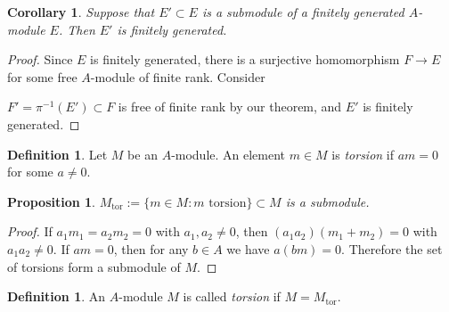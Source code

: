 \documentclass[12pt]{report}
\theoremstyle{plain}
\newtheorem{corollary}[theorem]{Corollary}
\newtheorem{proposition}[theorem]{Proposition}
\theoremstyle{remark}
\theoremstyle{definition}
\newtheorem{definition}[theorem]{Definition}
\begin{document}
\begin{corollary}
    Suppose that $E'\subset E$ is a submodule of a finitely generated $A$-module $E$. Then $E'$ is finitely generated.
\end{corollary}
\begin{proof}
    Since $E$ is finitely generated, there is a surjective homomorphism $F\to E$ for some free $A$-module of finite rank. Consider
    \begin{figure}[H]
        \centering
    \end{figure}
    \noindent $F'=\pi^{-1}(E')\subset F$ is free of finite rank by our theorem, and $E'$ is finitely generated.
\end{proof}

\begin{definition}
    Let $M$ be an $A$-module. An element $m\in M$ is \emph{torsion} if $am=0$ for some $a\neq 0$.
\end{definition}

\begin{proposition}
    $M_\mathrm{tor} :=\{m\in M:m\text{~torsion}\}\subset M$ is a submodule.
\end{proposition}
\begin{proof}
    If $a_1m_1=a_2m_2=0$ with $a_1,a_2\neq 0$, then $(a_1a_2)(m_1+m_2)=0$ with $a_1a_2\neq 0$. If $am=0$, then for any $b\in A$ we have $a(bm)=0$. Therefore the set of torsions form a submodule of $M$.
\end{proof}

\begin{definition}
    An $A$-module $M$ is called \emph{torsion} if $M=M_\mathrm{tor}$.
\end{definition}
\end{document}
